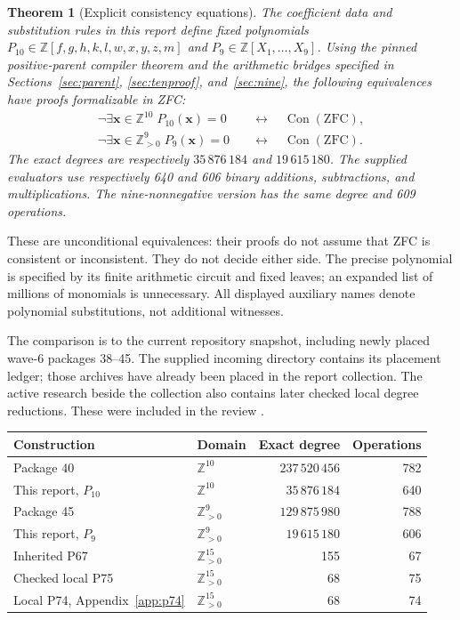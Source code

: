 \documentclass[11pt,letterpaper]{article}
\newtheorem{theorem}{Theorem}[section]
\theoremstyle{definition}\newtheorem{definition}[theorem]{Definition}
\newcommand{\Z}{\mathbb Z}\newcommand{\N}{\mathbb N}\newcommand{\Pos}{\mathbb Z_{>0}}
\newcommand{\Con}{\operatorname{Con}}\newcommand{\pc}{\operatorname{pc}}
\begin{document}
\begin{theorem}[Explicit consistency equations]
\label{thm:main}
The coefficient data and substitution rules in this report define fixed
polynomials $P_{10}\in\Z[f,g,h,k,l,w,x,y,z,m]$ and $P_9\in\Z[X_1,\ldots,X_9]$.
Using the pinned positive-parent compiler theorem and the arithmetic bridges
specified in Sections~\ref{sec:parent}, \ref{sec:tenproof}, and~\ref{sec:nine},
the following equivalences have proofs formalizable in ZFC:
\begin{align}
\neg\exists\mathbf x\in\Z^{10}\;P_{10}(\mathbf x)=0
 &\quad\longleftrightarrow\quad \Con(\mathrm{ZFC}),\label{eq:main10}\\
\neg\exists\mathbf x\in\Pos^9\;P_9(\mathbf x)=0
 &\quad\longleftrightarrow\quad \Con(\mathrm{ZFC}).\label{eq:main9}
\end{align}
The exact degrees are respectively $35\,876\,184$ and $19\,615\,180$.
The supplied evaluators use respectively 640 and 606 binary additions,
subtractions, and multiplications. The nine-nonnegative version has the same
degree and 609 operations.
\end{theorem}

These are unconditional equivalences: their proofs do not assume that ZFC
is consistent or inconsistent. They do not decide either side. The precise
polynomial is specified by its finite arithmetic circuit and fixed leaves;
an expanded list of millions of monomials is unnecessary. All displayed
auxiliary names denote polynomial substitutions, not additional witnesses.

The comparison is to the current repository snapshot, including newly
placed wave-6 packages 38--45. The supplied incoming directory contains its
placement ledger; those archives have already been placed in the report
collection. The active research beside the collection also contains later
checked local degree reductions. These were included in the review
\cite{snapshot,active,package40,package45}.

\begin{center}
\renewcommand{\arraystretch}{1.15}
\begin{tabular}{llrr}
\toprule
Construction & Domain & Exact degree & Operations\\
\midrule
Package 40 & $\Z^{10}$ & $237\,520\,456$ & 782\\
This report, $P_{10}$ & $\Z^{10}$ & $35\,876\,184$ & 640\\
Package 45 & $\Pos^9$ & $129\,875\,980$ & 788\\
This report, $P_9$ & $\Pos^9$ & $19\,615\,180$ & 606\\
Inherited P67 & $\Pos^{15}$ & 155 & 67\\
Checked local P75 & $\Pos^{15}$ & 68 & 75\\
Local P74, Appendix~\ref{app:p74} & $\Pos^{15}$ & 68 & 74\\
\bottomrule
\end{tabular}
\end{center}
\end{document}
